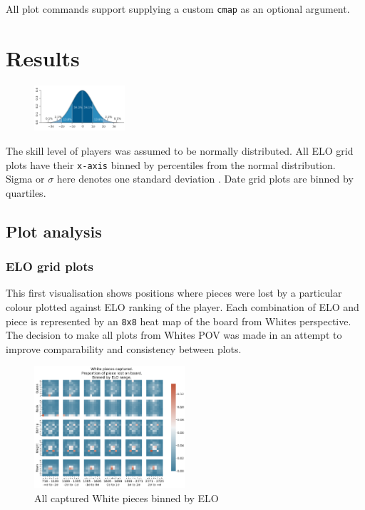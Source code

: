 \documentclass[11pt]{article}
\begin{document}
All plot commands support supplying a custom \texttt{cmap} as an optional argument.
\section{Results}
\label{sec:orgba64c7d}
\begin{figure}
\centering
\includegraphics[width=0.3\textwidth]{Images/1920px-Standard_deviation_diagram.png}
\end{figure}
The skill level of players was assumed to be normally distributed. All ELO grid plots have their \texttt{x-axis} binned by percentiles from the normal distribution. Sigma or \(\sigma\) here denotes one standard deviation \cite{NormalDist}.
Date grid plots are binned by quartiles.

\subsection{Plot analysis}
\label{sec:orga6c680a}
\subsubsection{ELO grid plots}
\label{sec:org235ccac}
This first visualisation shows positions where pieces were lost by a particular colour plotted against ELO ranking of the player. Each combination of ELO and piece is represented by an \texttt{8x8} heat map of the board from Whites perspective. The decision to make all plots from Whites POV was made in an attempt to improve comparability and consistency between plots.
\begin{figure}
\centering
\includegraphics[width=0.5\textwidth]{Images/_HEATMAP_Queen_Rook_Bishop_Knight_Pawn_WHITE_ELO_FISC.png}
\caption{All captured White pieces binned by ELO}
\end{figure}
\end{document}

